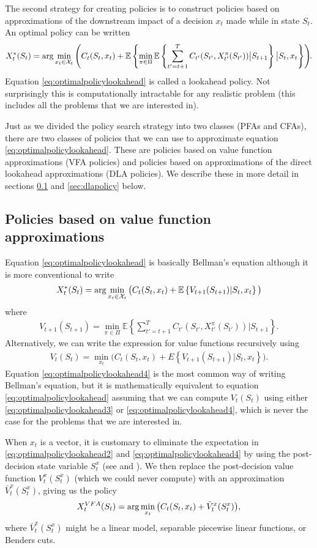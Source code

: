 \documentclass[11pt,oneside,fleqn,reqno,titlepage]{article}
\newcommand{\E}{\mathbb{E}}
\newcommand{\bn}{\begin{eqnarray}}
\newcommand{\en}{\end{eqnarray}}
\newcommand{\argmin}{{\rm arg}\min}
\def \Vbar{\bar V}
\begin{document}
The second strategy for creating policies is to construct policies based on approximations of the downstream impact of a decision $x_t$ made while in state $S_t$.  An optimal policy can be written
\bn
X^*_t(S_t) = \argmin_{x_t \in {\cal X}_t} \left(C_t(S_t,x_t) + \E \left\{ \min_{\pi\in\Pi} \E \left\{\sum_{t'=t+1}^T C_{t'}(S_{t'},X^\pi_{t'}(S_{t'})) \big| S_{t+1}\right\} \big| S_t,x_t \right\}\right)\hspace{-.04in}. \label{eq:optimalpolicylookahead}
\en
Equation \eqref{eq:optimalpolicylookahead} is called a lookahead policy.  Not surprisingly this is computationally intractable for any realistic problem (this includes all the problems that we are interested in).

Just as we divided the policy search strategy into two classes (PFAs and CFAs), there are two classes of policies that we can use to approximate equation \eqref{eq:optimalpolicylookahead}.  These are policies based on value function approximations (VFA policies) and policies based on approximations of the direct lookahead approximations (DLA policies).  We describe these in more detail in sections \ref{sec:vfapolicy} and \ref{sec:dlapolicy} below.




\subsection{Policies based on value function approximations}
\label{sec:vfapolicy}
Equation \eqref{eq:optimalpolicylookahead} is basically Bellman's equation although it is more conventional to write
\bn
X^*_t(S_t) = \argmin_{x_t \in {\cal X}_t} \big(C_t(S_t,x_t) + \E \left\{V_{t+1}(S_{t+1})|S_t,x_t\right\}\big) \label{eq:optimalpolicylookahead2}
\en
where
\bn
V_{t+1}(S_{t+1}) = \min_{\pi\in\Pi} \E \left\{\sum_{t'=t+1}^T C_{t'}(S_{t'},X^\pi_{t'}(S_{t'})) \big| S_{t+1}\right\}. \label{eq:optimalpolicylookahead3}
\en
Alternatively, we can write the expression for value functions recursively using
\bn
V_t(S_t) = \min_{x_t}\big(C_t(S_t,x_t) + E  \left\{V_{t+1}(S_{t+1})|S_t,x_t\right\}\big).\label{eq:optimalpolicylookahead4}
\en
Equation \eqref{eq:optimalpolicylookahead4} is the most common way of writing Bellman's equation, but it is mathematically equivalent to equation \eqref{eq:optimalpolicylookahead} assuming that we can compute $V_t(S_t)$ using either \eqref{eq:optimalpolicylookahead3} or \eqref{eq:optimalpolicylookahead4}, which is never the case for the problems that we are interested in.

When $x_t$ is a vector, it is customary to eliminate the expectation in \eqref{eq:optimalpolicylookahead2} and \eqref{eq:optimalpolicylookahead4} by using the post-decision state variable $S^x_t$ (see \cite{PowellADP2011} and \cite{Shapiro2011}).  We then replace the post-decision value function $V^x_t(S^x_t)$ (which we could never compute) with an approximation $\Vbar^x_t(S^x_t)$, giving us the policy
\bn
X^{VFA}_t(S_t) = \argmin_{x_t}\big(C_t(S_t,x_t) + \Vbar^x_t(S^x_t)\big),\label{eq:optimalpolicylookahead5}
\en
where $\Vbar^x_t(S^x_t)$ might be a linear model, separable piecewise linear functions, or Benders cuts.
\end{document}
